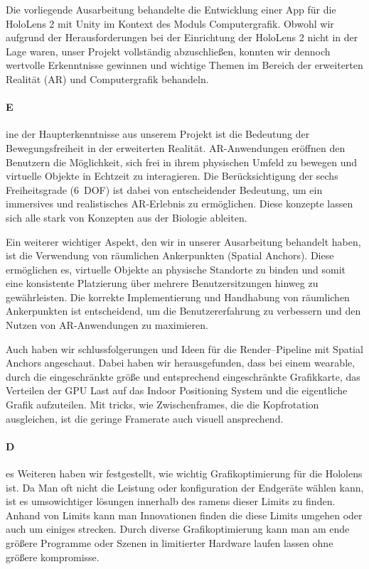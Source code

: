 Die vorliegende Ausarbeitung behandelte die Entwicklung einer App für die HoloLens 2 mit Unity im Kontext des Moduls Computergrafik.
Obwohl wir aufgrund der Herausforderungen bei der Einrichtung der HoloLens 2 nicht in der Lage waren, unser Projekt vollständig abzuschließen, konnten wir dennoch wertvolle Erkenntnisse gewinnen und wichtige Themen im Bereich der erweiterten Realität (AR) und Computergrafik behandeln.

\paragraph{E}ine der Haupterkenntnisse aus unserem Projekt ist die Bedeutung der Bewegungsfreiheit in der erweiterten Realität.
    AR-Anwendungen eröffnen den Benutzern die Möglichkeit, sich frei in ihrem physischen Umfeld zu bewegen und virtuelle Objekte in Echtzeit zu interagieren.
    Die Berücksichtigung der sechs Freiheitsgrade (6~DOF) ist dabei von entscheidender Bedeutung, um ein immersives und realistisches AR-Erlebnis zu ermöglichen.
    Diese konzepte lassen sich alle stark von Konzepten aus der Biologie ableiten.


    Ein weiterer wichtiger Aspekt, den wir in unserer Ausarbeitung behandelt haben, ist die Verwendung von räumlichen Ankerpunkten (Spatial Anchors).
    Diese ermöglichen es, virtuelle Objekte an physische Standorte zu binden und somit eine konsistente Platzierung über mehrere Benutzersitzungen hinweg zu gewährleisten.
    Die korrekte Implementierung und Handhabung von räumlichen Ankerpunkten ist entscheidend, um die Benutzererfahrung zu verbessern und den Nutzen von AR-Anwendungen zu maximieren.

    Auch haben wir schlussfolgerungen und Ideen für die Render--Pipeline mit Spatial Anchors angeschaut.
    Dabei haben wir herausgefunden, dass bei einem wearable, durch die eingeschränkte größe und entsprechend eingeschränkte Grafikkarte, das Verteilen der GPU Last auf das Indoor Positioning System und die eigentliche Grafik aufzuteilen.
    Mit tricks, wie Zwischenframes, die die Kopfrotation ausgleichen, ist die geringe Framerate auch visuell ansprechend.

\paragraph{D}es Weiteren haben wir festgestellt, wie wichtig Grafikoptimierung für die Hololens ist. 
Da Man oft nicht die Leistung oder konfiguration der Endgeräte wählen kann, ist es umsowichtiger lösungen innerhalb des ramens dieser Limits zu finden.
Anhand von Limits kann man Innovationen finden die diese Limits umgehen oder auch um einiges strecken.
Durch diverse Grafikoptimierung kann man am ende größere Programme oder Szenen in limitierter Hardware laufen lassen ohne größere kompromisse.

